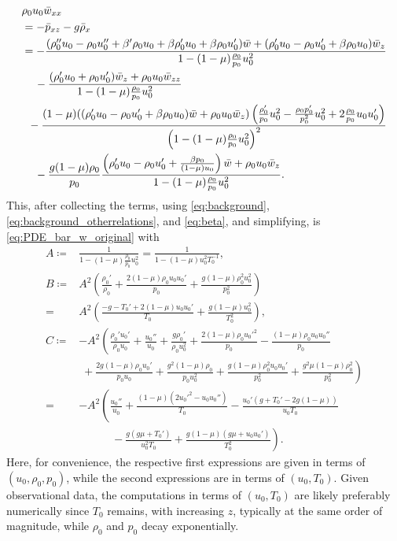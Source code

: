 \documentclass[11pt,twoside,reqno,centertags]{amsart}
\theoremstyle{definition}
\begin{document}
\begin{align*}
	&\rho_0u_0\bar w_{xx}\\
	&=-\bar p_{xz}-g\bar\rho_x\\
	&=-\frac{(\rho_0''u_0-\rho_0u_0''+\beta'\rho_0u_0+\beta\rho_0'u_0+\beta\rho_0u_0')\bar w+(\rho_0'u_0-\rho_0u_0'+\beta\rho_0u_0)\bar w_z}{1-(1-\mu)\frac{\rho_0}{p_0}u_0^2}\\
	&\quad\,-\frac{(\rho_0'u_0+\rho_0u_0')\bar w_z+\rho_0u_0\bar w_{zz}}{1-(1-\mu)\frac{\rho_0}{p_0}u_0^2}\\
	&\omit\hfill$\displaystyle{}-\frac{(1-\mu)((\rho_0'u_0-\rho_0u_0'+\beta\rho_0u_0)\bar w +\rho_0u_0\bar w_z)\left(\frac{\rho_0'}{p_0}u_0^2-\frac{\rho_0p_0'}{p_0^2}u_0^2+2\frac{\rho_0}{p_0}u_0u_0'\right)}{\left(1-(1-\mu)\frac{\rho_0}{p_0}u_0^2\right)^2}$\\
	&\quad\,-\frac{g(1-\mu)\rho_0}{p_0}\frac{\left(\rho_0'u_0-\rho_0u_0'+\frac{\beta p_0}{(1-\mu)u_0}\right)\bar w+\rho_0u_0\bar w_z}{1-(1-\mu)\frac{\rho_0}{p_0}u_0^2}.
\end{align*}
This, after collecting the terms, using \eqref{eq:background}, \eqref{eq:background_otherrelations}, and \eqref{eq:beta}, and simplifying, is \eqref{eq:PDE_bar_w_original} with
\begin{subequations}\label{eq:ABC}
	\begin{align}
		A\coloneqq{}&\frac{1}{1-(1-\mu)\frac{\rho_0}{p_0}u_0^2} = \frac{1}{1-(1-\mu)u_0^2T_0^{-1}},\label{eq:A}\\
		B\coloneqq{}& A^2\left(\frac{\rho_0'}{\rho_0}+\frac{2(1-\mu)\rho_0u_0u_0'}{p_0}+\frac{g(1-\mu)\rho_0^2u_0^2}{p_0^2}\right)\\
		={}& A^2\left(\frac{-g-T_0'+2(1-\mu)u_0u_0'}{T_0}+\frac{g(1-\mu)u_0^2}{T_0^2}\right),\nonumber\\
		C\coloneqq& -A^2\left(\frac{\rho_0'u_0'}{\rho_0u_0}+\frac{u_0''}{u_0}+\frac{g\rho_0'}{\rho_0u_0^2}+\frac{2(1-\mu)\rho_0u_0'^2}{p_0}-\frac{(1-\mu)\rho_0u_0u_0''}{p_0}\right.\nonumber\\
		&\;\left.{}+\frac{2g(1-\mu)\rho_0u_0'}{p_0u_0}+\frac{g^2(1-\mu)\rho_0}{p_0u_0^2}+\frac{g(1-\mu)\rho_0^2u_0u_0'}{p_0^2}+\frac{g^2\mu(1-\mu)\rho_0^2}{p_0^2}\right)\label{eq:C}\\
		=&-A^2\left(\frac{u_0''}{u_0}+\frac{(1-\mu)(2u_0'^2-u_0u_0'')}{T_0}-\frac{u_0'(g+T_0'-2g(1-\mu))}{u_0T_0}\right.\nonumber\\
		&\qquad\quad\left.{}-\frac{g(g\mu+T_0')}{u_0^2T_0}+\frac{g(1-\mu)(g\mu+u_0u_0')}{T_0^2}\right).\nonumber
	\end{align}
\end{subequations}
Here, for convenience, the respective first expressions are given in terms of $(u_0,\rho_0,p_0)$, while the second expressions are in terms of $(u_0,T_0)$. Given observational data, the computations in terms of $(u_0,T_0)$ are likely preferably numerically since $T_0$ remains, with increasing $z$, typically at the same order of magnitude, while $\rho_0$ and $p_0$ decay exponentially.
\end{document}
